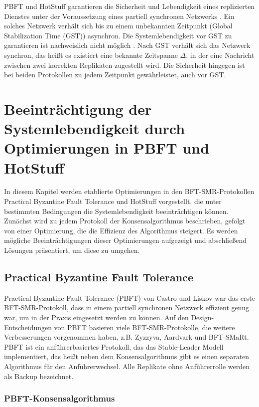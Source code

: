 \documentclass[nonacm,sigconf,natbib=false]{acmart}
\begin{document}
PBFT und HotStuff garantieren die Sicherheit und Lebendigkeit eines replizierten Dienstes unter der Voraussetzung eines partiell synchronen Netzwerks \cite{partial-sync-network}. Ein solches Netzwerk verhält sich bis zu einem unbekannten Zeitpunkt (Global Stabilization Time (GST)) asynchron. Die Systemlebendigkeit vor GST zu garantieren ist nachweislich nicht möglich \cite{gst}. Nach GST verhält sich das Netzwerk synchron, das heißt es existiert eine bekannte Zeitspanne $\Delta$, in der eine Nachricht zwischen zwei korrekten Replikaten zugestellt wird. Die Sicherheit hingegen ist bei beiden Protokollen zu jedem Zeitpunkt gewährleistet, auch vor GST.

\section{Beeinträchtigung der Systemlebendigkeit durch Optimierungen in PBFT und HotStuff}

In diesem Kapitel werden etablierte Optimierungen in den BFT-SMR-Protokollen Practical Byzantine Fault Tolerance und HotStuff vorgestellt, die unter bestimmten Bedingungen die Systemlebendigkeit beeinträchtigen können. Zunächst wird zu jedem Protokoll der Konsensalgorithmus beschrieben, gefolgt von einer Optimierung, die die Effizienz des Algorithmus steigert. Es werden mögliche Beeinträchtigungen dieser Optimierungen aufgezeigt und abschließend Lösungen präsentiert, um diese zu umgehen.

\subsection{Practical Byzantine Fault Tolerance}

Practical Byzantine Fault Tolerance (PBFT)\cite{pbft} von Castro und Liskov war das erste BFT-SMR-Protokoll, dass in einem partiell synchronen Netzwerk effizient genug war, um in der Praxis eingesetzt werden zu können. Auf den Design-Entscheidungen von PBFT basieren viele BFT-SMR-Protokolle, die weitere Verbesserungen vorgenommen haben, z.B. Zyzzyva\cite{zyzzyva}, Aardvark\cite{aardvark} und BFT-SMaRt\cite{bft-smart}. PBFT ist ein anführerbasiertes Protokoll, das das Stable-Leader Modell implementiert, das heißt neben dem Konsensalgorithmus gibt es einen separaten Algorithmus für den Anführerwechsel. Alle Replikate ohne Anführerrolle werden als Backup bezeichnet.

\subsubsection{PBFT-Konsensalgorithmus}
\end{document}
